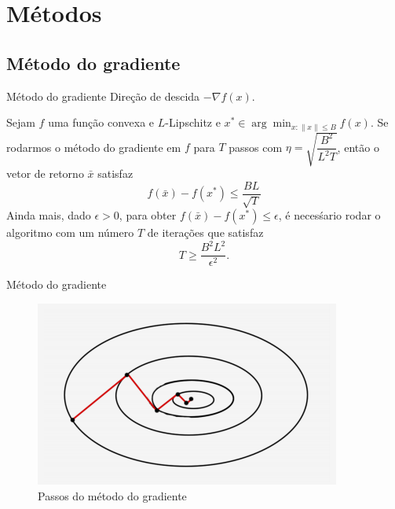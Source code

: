 \documentclass{beamer}
\newcommand{\norm}[1]{\left\lVert#1\right\rVert}
\begin{document}
\section{Métodos}
    \subsection{Método do gradiente}
        \begin{frame}{Método do gradiente}
            Direção de descida $-\nabla f(x)$.

            \begin{theorem}
                Sejam $f$ uma função convexa e $L$-Lipschitz e $x^{*} \in \arg\min_{x: \norm{x} \leq B} f(x)$. Se rodarmos o método do gradiente em $f$ para $T$ passos com $\eta = \sqrt{\dfrac{B^2}{L^2T}}$, então o vetor de retorno $\bar{x}$ satisfaz
                \begin{equation*}
                    f(\bar{x}) - f(x^{*}) \leq \frac{BL}{\sqrt{T}}
                \end{equation*}
                Ainda mais, dado $\epsilon > 0$, para obter $f(\bar{x}) - f(x^{*}) \leq \epsilon$, é necesśario rodar o algoritmo com um número $T$ de iterações que satisfaz
                \begin{equation*}
                    T \geq \frac{B^2L^2}{\epsilon^2}.
                \end{equation*}
            \end{theorem}
        \end{frame}

        \begin{frame}{Método do gradiente}
            \begin{figure}
                \centering
                \includegraphics[width=.80\textwidth]{gradiente.png}
                \caption{Passos do método do gradiente}
                \label{fig:gc}
            \end{figure}
        \end{frame}
\end{document}
